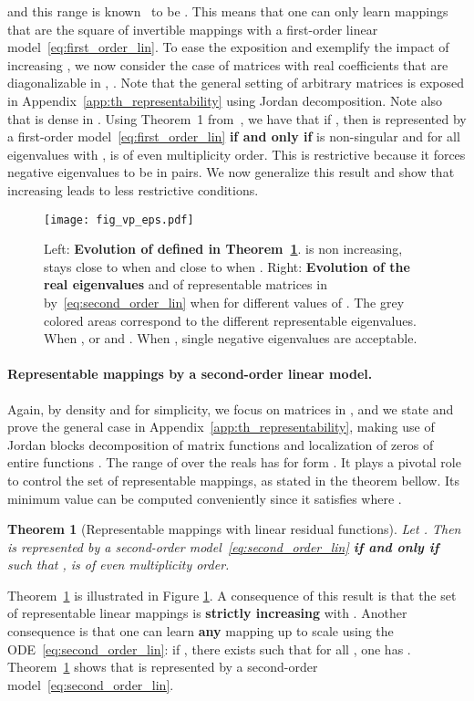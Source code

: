 \documentclass{article}
\newtheorem{theorem}{Theorem}
\begin{document}
and this range is known~\citep{andrica2010image} to be
.
This means that one can only learn mappings that are the square of invertible mappings with a first-order linear model~\eqref{eq:first_order_lin}. 
To ease the exposition and exemplify the impact of increasing , we now consider the case of matrices with real coefficients that are diagonalizable in , . 
Note that the general setting of arbitrary matrices is exposed in Appendix~\ref{app:th_representability} using Jordan decomposition. Note also that  is dense in  \citep{10.2307/2160975}. 
Using Theorem~1 from~\citet{culver1966existence}, we have that if , then  is represented by a first-order model~\eqref{eq:first_order_lin} \textbf{if and only if}  is non-singular and for all eigenvalues  with ,  is of even multiplicity order. This is restrictive because it forces negative eigenvalues to be in pairs. We now generalize this result and show that increasing  leads to less restrictive conditions.
\begin{figure}[H]
\centering
 \texttt{[image: fig\_vp\_eps.pdf]}
\caption{Left: \textbf{Evolution of  defined in Theorem~\ref{th:representability}}.  is non increasing, stays close to  when  and close to  when . Right: \textbf{Evolution of the real eigenvalues}  and  of representable matrices in  by~\eqref{eq:second_order_lin} when  for different values of . The grey colored areas correspond to the different representable eigenvalues. When ,  or  and . When , single negative eigenvalues are acceptable.}\label{fig:linear}
\vspace{-1em}
\end{figure}
\paragraph{Representable mappings by a second-order linear model.}
Again, by density and for simplicity, we focus on matrices in , and we state and prove the general case in Appendix~\ref{app:th_representability}, making use of Jordan blocks decomposition of matrix functions \citep{gant} and localization of zeros of entire functions \citep{runckel1969zeros}. 
The range of  over the reals has for form . It plays a pivotal role to control the set of representable mappings, as stated in the theorem bellow. Its minimum value can be computed conveniently since it satisfies
 where
.
\begin{theorem}[Representable mappings with linear residual functions]\label{th:representability}
Let .
Then  is represented by a second-order model~\eqref{eq:second_order_lin} \textbf{if and only if}  such that
,  is of even multiplicity order.
\end{theorem}
Theorem~\ref{th:representability} is illustrated in Figure \ref{fig:linear}. 
A consequence of this result is that the set of representable linear mappings is \textbf{strictly increasing} with .
Another consequence is that one can learn \textbf{any} mapping up to scale using the ODE~\eqref{eq:second_order_lin}: if , there exists  such that for all , one has . Theorem~\ref{th:representability} shows that  is represented by a second-order model~\eqref{eq:second_order_lin}.
\end{document}
